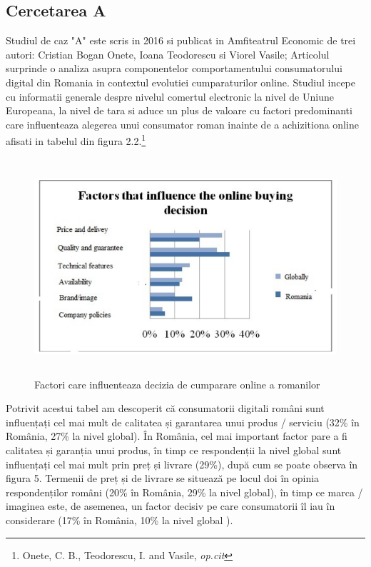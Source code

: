 \documentclass[a4paper, 12pt]{article}
\begin{document}
 \subsection{Cercetarea A}
 Studiul de caz "A" este scris in 2016 si publicat in Amfiteatrul Economic  de trei autori: Cristian Bogan Onete, Ioana Teodorescu si Viorel Vasile; Articolul surprinde o analiza asupra componentelor comportamentului consumatorului digital din Romania in contextul evolutiei cumparaturilor online. Studiul incepe cu informatii generale despre nivelul comertul electronic la nivel de Uniune Europeana, la nivel de tara si aduce un plus de valoare cu  factori predominanti care influenteaza alegerea unui consumator roman inainte de a achizitiona online afisati in tabelul din figura 2.2.\footnote{Onete, C. B., Teodorescu, I. and Vasile, \textit{op.cit}}
 	\begin{figure}[!htb]
 	\centering
 	\includegraphics[width=12cm, height=8cm]{"figures/fifth.png"}
 	\caption{Factori care influenteaza decizia de cumparare online a romanilor}\label{fig:fifth}
 \end{figure}

		\quad  Potrivit acestui tabel am descoperit că consumatorii digitali români sunt influențați cel mai mult de calitatea și garantarea unui produs / serviciu (32\% în România, 27\% la nivel global). În România, cel mai important factor pare a fi calitatea și garanția unui produs, în timp ce respondenții la nivel global sunt influențați cel mai mult prin preț și livrare (29\%), după cum se poate observa în figura 5. Termenii de preț și de livrare se situează pe locul doi în opinia respondenților români (20\% în România, 29\% la nivel global), în timp ce marca / imaginea este, de asemenea, un factor decisiv pe care consumatorii îl iau în considerare (17\% în România, 10\% la nivel global ).
		
\end{document}
